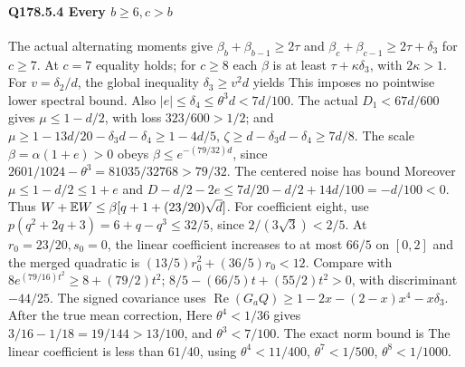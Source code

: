 \paragraph{Q178.5.4 Every $b\ge\allowbreak 6,\allowbreak c>\allowbreak b$}\label{part:Q178.5.4}
The actual alternating moments give
$\beta_b+\beta_{b-1}\ge\allowbreak 2\tau$ and
$\beta_c+\beta_{c-1}\ge\allowbreak 2\tau+\delta_3$ for $c\ge\allowbreak 7$.
At $c=\allowbreak 7$ equality holds; for $c\ge\allowbreak 8$ each $\beta$ is at least
$\tau+\kappa\delta_3$, with $2\kappa>\allowbreak 1$.
For $v=\allowbreak \delta_2/d$, the global inequality $\delta_3\ge\allowbreak  v^2d$ yields
This imposes no pointwise lower spectral bound.
Also $|e|\le\allowbreak \delta_4\le\allowbreak \theta^3d<\allowbreak 7d/100$.
The actual $D_1<\allowbreak 67d/600$ gives $\mu\le\allowbreak 1-d/2$, with loss
$323/600>\allowbreak 1/2$; and
$\mu\ge\allowbreak 1-13d/20-\delta_3d-\delta_4\ge\allowbreak 1-4d/5$,
$\zeta\ge\allowbreak  d-\delta_3d-\delta_4\ge\allowbreak 7d/8$.
The scale $\beta=\allowbreak \alpha(1+e)>\allowbreak 0$ obeys $\beta\le\allowbreak  e^{-(79/32)d}$,
since $2601/1024-\theta^3=\allowbreak 81035/32768>\allowbreak 79/32$.
The centered noise has bound
Moreover $\mu\le\allowbreak 1-d/2\le\allowbreak 1+e$ and
$D-d/2-2e\le\allowbreak 7d/20-d/2+14d/100=\allowbreak -d/100<\allowbreak 0$.
Thus $W+\mathbb E W\le\allowbreak \beta[q+1+(23/20)\sqrt d]$.
For coefficient eight, use
$p(q^2+2q+3)=\allowbreak 6+q-q^3\le\allowbreak 32/5$, since $2/(3\sqrt3)<\allowbreak 2/5$.
At $r_0=\allowbreak 23/20,\allowbreak s_0=\allowbreak 0$, the linear coefficient increases to at most
$66/5$ on $[0,\allowbreak 2]$ and the merged quadratic is
$(13/5)r_0^2+(36/5)r_0<\allowbreak 12$.
Compare with $8e^{(79/16)t^2}\ge\allowbreak 8+(79/2)t^2$;
$8/5-(66/5)t+(55/2)t^2>\allowbreak 0$, with discriminant $-44/25$.
The signed covariance uses
$\operatorname{Re}(G_aQ)\ge\allowbreak 1-2x-(2-x)x^4-x\delta_3$.
After the true mean correction,
Here $\theta^4<\allowbreak 1/36$ gives $3/16-1/18=\allowbreak 19/144>\allowbreak 13/100$,
and $\theta^3<\allowbreak 7/100$.
The exact norm bound is
The linear coefficient is less than $61/40$, using
$\theta^4<\allowbreak 11/400$, $\theta^7<\allowbreak 1/500$, $\theta^8<\allowbreak 1/1000$.
